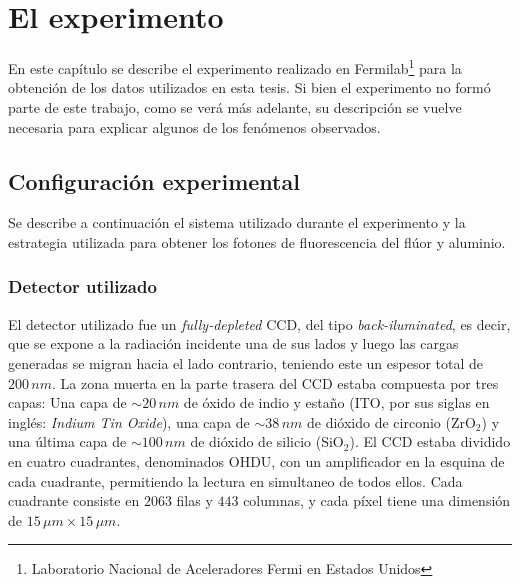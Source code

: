 \chapter{El experimento \label{chap:ConfiguracionExperimental}}

\noindent En este capítulo se describe el experimento realizado en Fermilab\footnote{Laboratorio Nacional de Aceleradores Fermi en Estados Unidos} para la obtención de los datos utilizados en esta tesis. Si bien el experimento no formó parte de este trabajo, como se verá más adelante, su descripción se vuelve necesaria para explicar algunos de los fenómenos observados.

\section{Configuración experimental}
\noindent Se describe a continuación el sistema utilizado durante el experimento y la estrategia utilizada para obtener los fotones de fluorescencia del flúor y aluminio.

\subsection{Detector utilizado}
\noindent El detector utilizado fue un \textit{fully-depleted} CCD, del tipo \textit{back-iluminated}, es decir, que se expone a la radiación incidente una de sus lados y luego las cargas generadas se migran hacia el lado contrario, teniendo este un espesor total de $200\,\si{nm}$. La zona muerta en la parte trasera del CCD estaba compuesta por tres capas: Una capa de $\sim 20\,\si{nm}$ de óxido de indio y estaño (ITO, por sus siglas en inglés: \textit{Indium Tin Oxide}), una capa de $\sim 38\,\si{nm}$ de dióxido de circonio (ZrO$_{2}$) y una última capa de $\sim 100\,\si{nm}$ de dióxido de silicio (SiO$_{2}$). El CCD estaba dividido en cuatro cuadrantes, denominados OHDU, con un amplificador en la esquina de cada cuadrante, permitiendo la lectura en simultaneo de todos ellos. Cada cuadrante consiste en $2063$ filas y $443$ columnas, y cada píxel tiene una dimensión de $15\,\si{\mu m} \times 15\,\si{\mu m}$.

